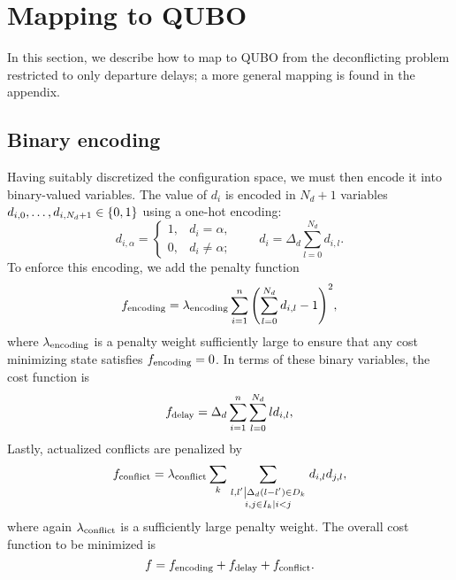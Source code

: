 \section{Mapping to QUBO}
\label{sec:mapping}
In this section, we describe how to map to QUBO from the deconflicting problem restricted to only departure delays; a more general mapping is found in the appendix.

\subsection{Binary encoding}
Having suitably discretized the configuration space, we must then encode it into binary-valued variables.
The value of $d_i$ is encoded in $N_d + 1$ variables $d_{i,0}, \ldots, d_{i,N_d + 1} \in {\{0, 1\}}$ using a one-hot encoding:
\begin{equation}
d_{i, \alpha} = \begin{cases}
1, & d_i = \alpha,\\
0, & d_i \neq \alpha;
\end{cases}
\qquad
d_i = \Delta_d \sum_{l = 0}^{N_d} d_{i,l}.
\end{equation}
To enforce this encoding, we add the penalty function
\begin{equation}
\label{eq:dep-delay-encoding-penalty}
f_{\mathrm{encoding}} = 
\lambda_{\mathrm{encoding}} 
\sum_{i = 1}^n 
{\left(
\sum_{l = 0}^{N_d} d_{i,l} - 1
\right)}^2,
\end{equation}
where $\lambda_{\mathrm{encoding}}$ is a penalty weight sufficiently large to ensure that any cost minimizing state satisfies $f_{\mathrm{encoding}} = 0$.
In terms of these binary variables, the cost function is 
\begin{equation}
\label{departure_delay_model_qubo_departure}
f_{\mathrm{delay}} = 
\Delta_d
\sum_{i=1}^n 
\sum_{l=0}^{N_d} l d_{i,l},
\end{equation}
Lastly, actualized conflicts are penalized by 
\begin{equation}
  f_{\mathrm{conflict}}
=
\lambda_{\mathrm{conflict}}
\sum_{k}
\sum_{\substack{\left.l, l' \middle| \Delta_d (l - l') \in D_k\right.\\
\left. i, j \in I_k \middle| i < j \right.}}
  d_{i,l} d_{j, l},
\end{equation}
where again $\lambda_{\mathrm{conflict}}$ is a sufficiently large penalty weight. 
The overall cost function to be minimized is 
\begin{equation}
f
=
f_{\mathrm{encoding}} + f_{\mathrm{delay}} + f_{\mathrm{conflict}}.
\end{equation}



